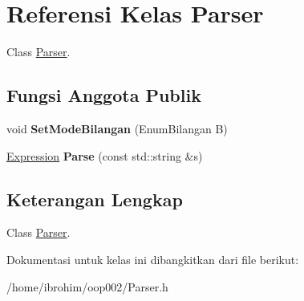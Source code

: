 \hypertarget{classParser}{}\section{Referensi Kelas Parser}
\label{classParser}


Class \hyperlink{classParser}{Parser}.  


\subsection*{Fungsi Anggota Publik}
\begin{DoxyCompactItemize}
\item 
\hypertarget{classParser_a44fc8feda2b68b7bfcba5a3d1a60df8c}{}void {\bfseries Set\+Mode\+Bilangan} (Enum\+Bilangan B)\label{classParser_a44fc8feda2b68b7bfcba5a3d1a60df8c}

\item 
\hypertarget{classParser_a9241f5ed7a2c1959ed0bbb6f333d30eb}{}\hyperlink{classExpression}{Expression} {\bfseries Parse} (const std\+::string \&s)\label{classParser_a9241f5ed7a2c1959ed0bbb6f333d30eb}

\end{DoxyCompactItemize}


\subsection{Keterangan Lengkap}
Class \hyperlink{classParser}{Parser}. 

Dokumentasi untuk kelas ini dibangkitkan dari file berikut\+:\begin{DoxyCompactItemize}
\item 
/home/ibrohim/oop002/Parser.\+h\end{DoxyCompactItemize}
